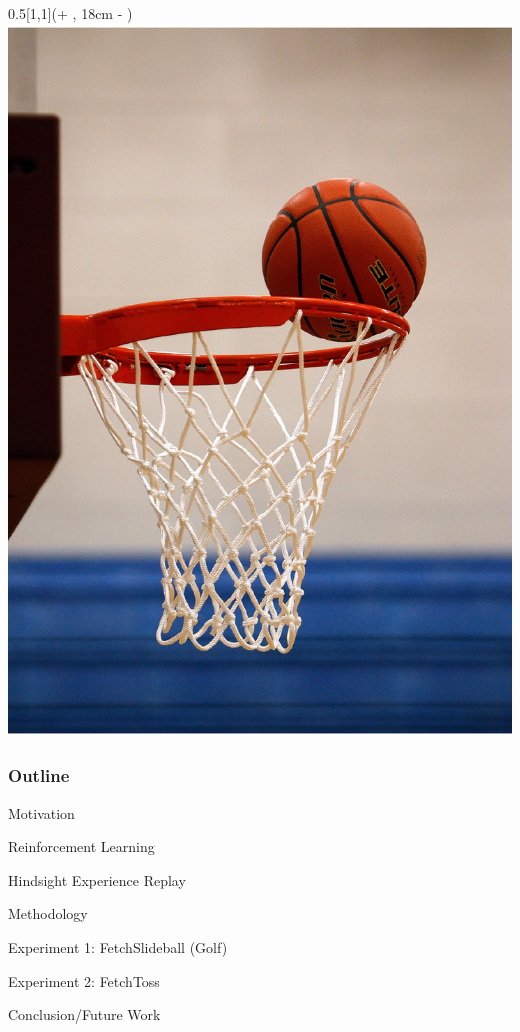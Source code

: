 \begin{frame}
	\begin{textblock*}{0.5\paperwidth}[1,1](\textwidth + \PraesentationSeitenrand, 18cm - \PraesentationSeitenrand)%
		\includegraphics[width=0.4\paperwidth]{./Ressourcen/Figures/basketball.pdf}
	\end{textblock*}
	
\end{frame}
\clearpage






\begin{frame}
	\frametitle{Outline}
	
	\vspace{1cm}
	\begin{PraesentationAufzaehlung}
		\item Motivation
		\item Reinforcement Learning
		\item Hindsight Experience Replay
		\item Methodology
		\item Experiment 1: FetchSlideball (Golf)
		\item Experiment 2: FetchToss
		\item Conclusion/Future Work
	\end{PraesentationAufzaehlung}
	
\end{frame}
\clearpage

